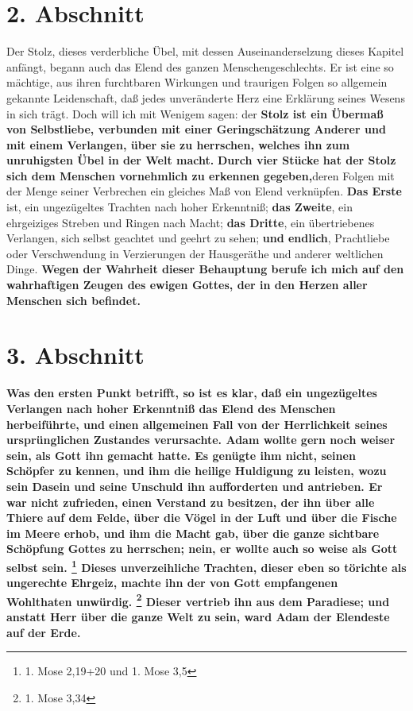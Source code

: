 \section{2. Abschnitt} \label{kap7_ab2}

Der Stolz, dieses verderbliche Übel, mit dessen Auseinanderselzung dieses
Kapitel anfängt, begann auch das Elend des ganzen Menschengeschlechts. Er ist
eine so mächtige, aus ihren furchtbaren Wirkungen und traurigen Folgen so
allgemein gekannte Leidenschaft, daß jedes unveränderte Herz eine Erklärung
seines Wesens in sich trägt. Doch will ich mit Wenigem sagen: der \textbf{Stolz ist ein Übermaß von Selbstliebe, verbunden mit einer Geringschätzung Anderer und mit einem Verlangen, über sie zu herrschen, welches ihn zum unruhigsten Übel in der
Welt macht.} \textbf{Durch vier Stücke hat der Stolz sich dem Menschen vornehmlich zu
erkennen gegeben,}deren Folgen mit der Menge seiner Verbrechen ein gleiches Maß
von Elend verknüpfen. \textbf{Das Erste} ist, ein ungezügeltes Trachten nach hoher
Erkenntniß; \textbf{das Zweite}, ein ehrgeiziges Streben und Ringen nach Macht; \textbf{das Dritte}, ein übertriebenes Verlangen, sich selbst geachtet und geehrt zu sehen;
\textbf{und endlich}, Prachtliebe oder Verschwendung in Verzierungen der Hausgeräthe und anderer weltlichen Dinge. \textbf{Wegen der Wahrheit dieser Behauptung berufe ich mich auf den wahrhaftigen Zeugen des ewigen Gottes, der in den Herzen aller Menschen
sich befindet.}

\section{3. Abschnitt} \label{kap7_ab3}

\textbf{Was den ersten Punkt betrifft, so ist es klar, daß ein ungezügeltes Verlangen
nach hoher Erkenntniß  das Elend des Menschen herbeiführte, und einen allgemeinen
Fall von der Herrlichkeit seines ursprünglichen Zustandes verursachte.    Adam
wollte gern noch weiser sein, als Gott ihn gemacht hatte. Es genügte ihm nicht,
seinen Schöpfer zu kennen, und ihm die heilige Huldigung zu leisten, wozu sein
Dasein und seine Unschuld ihn aufforderten und antrieben. Er war nicht
zufrieden, einen Verstand zu besitzen, der ihn über alle Thiere auf dem Felde,
über die Vögel in der Luft und über die Fische im Meere erhob, und ihm die Macht
gab, über die ganze sichtbare Schöpfung Gottes zu herrschen; nein, er wollte
auch so weise als Gott selbst sein.
\footnote{1. Mose 2,19+20 und 1. Mose 3,5}
Dieses unverzeihliche Trachten, dieser eben so törichte als ungerechte Ehrgeiz, machte
ihn der von Gott empfangenen Wohlthaten unwürdig.
\footnote{1. Mose 3,34}
Dieser vertrieb ihn aus dem Paradiese; und anstatt Herr über die ganze Welt zu sein, ward Adam der Elendeste auf der Erde.}

